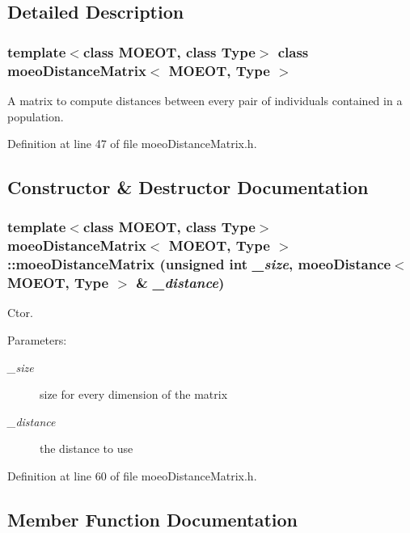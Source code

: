 \subsection{Detailed Description}
\subsubsection*{template$<$class MOEOT, class Type$>$ class moeo\-Distance\-Matrix$<$ MOEOT, Type $>$}

A matrix to compute distances between every pair of individuals contained in a population. 



Definition at line 47 of file moeo\-Distance\-Matrix.h.

\subsection{Constructor \& Destructor Documentation}
\subsubsection{\setlength{\rightskip}{0pt plus 5cm}template$<$class MOEOT, class Type$>$ \bf{moeo\-Distance\-Matrix}$<$ MOEOT, Type $>$::\bf{moeo\-Distance\-Matrix} (unsigned int {\em \_\-size}, \bf{moeo\-Distance}$<$ MOEOT, Type $>$ \& {\em \_\-distance})\hspace{0.3cm}{\tt  [inline]}}\label{classmoeoDistanceMatrix_5526260bd46b6877abd700a15b9b9ee8}


Ctor. 

\begin{Desc}
\item[Parameters:]
\begin{description}
\item[{\em \_\-size}]size for every dimension of the matrix \item[{\em \_\-distance}]the distance to use \end{description}
\end{Desc}


Definition at line 60 of file moeo\-Distance\-Matrix.h.

\subsection{Member Function Documentation}
